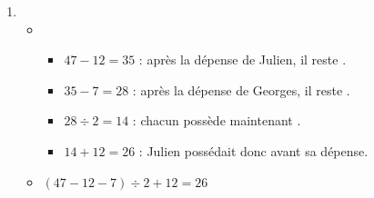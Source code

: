 {{\begin{enumerate}
\begin{itemize}
            \end{itemize}
            \item 
            \begin{itemize}
                \item \begin{itemize}
                    \item $47 - 12 = 35$ : après la dépense de Julien, il reste .
                    \item $35 - 7 = 28$ : après la dépense de Georges, il reste .
                    \item $28 \div 2 = 14$ : chacun possède maintenant .
                    \item $14 + 12 = 26$ : Julien possédait donc  avant sa dépense.
                \end{itemize}
                \item $(47 - 12 - 7) \div 2 + 12 = 26$
            \end{itemize}
        \end{enumerate}
    }
}